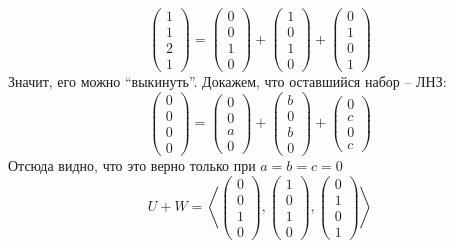 $$
\begin{pmatrix}
	1 \\
    1 \\
    2 \\
    1
\end{pmatrix} =
\begin{pmatrix}
	0 \\
    0 \\
    1 \\
    0
\end{pmatrix} +
\begin{pmatrix}
	1 \\
    0 \\
    1 \\
    0
\end{pmatrix} +
\begin{pmatrix}
	0 \\
    1 \\
    0 \\
    1
\end{pmatrix} $$
Значит, его можно ``выкинуть''. Докажем, что оставшийся набор -- ЛНЗ:
$$
\begin{pmatrix}
	0 \\
    0 \\
    0 \\
    0
\end{pmatrix} =
\begin{pmatrix}
	0 \\
    0 \\
    a \\
    0
\end{pmatrix} +
\begin{pmatrix}
	b \\
    0 \\
    b \\
    0
\end{pmatrix} +
\begin{pmatrix}
	0 \\
    c \\
    0 \\
    c
\end{pmatrix} $$
Отсюда видно, что это верно только при $ a = b = c = 0 $
$$ U + W = \left\langle
\begin{pmatrix}
	0 \\
    0 \\
    1 \\
    0
\end{pmatrix},
\begin{pmatrix}
	1 \\
    0 \\
    1 \\
    0
\end{pmatrix},
\begin{pmatrix}
	0 \\
    1 \\
    0 \\
    1
\end{pmatrix} \right\rangle $$

